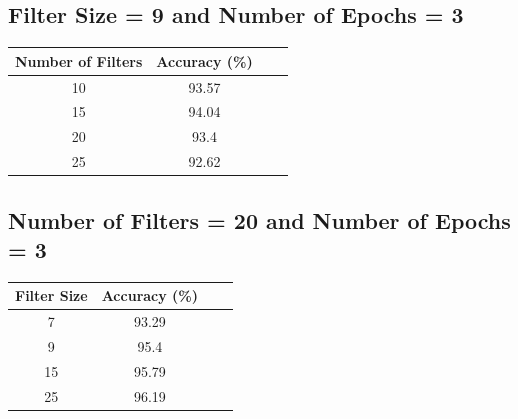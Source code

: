 \documentclass{article}
\begin{document}
\subsection{Filter Size = 9 and Number of Epochs = 3}
\begin{center}
 \begin{tabular}{||c| c| c| c||} 
 \hline
Number of Filters & Accuracy (\%)\\ [0.5ex] 
 \hline\hline
 10 & 93.57  \\ 
 \hline
 15 & 94.04 \\ 
 \hline
 20 & 93.4 \\
 \hline
 25 & 92.62 \\
 \hline
 
\end{tabular}
\end{center}

\subsection{Number of Filters = 20 and Number of Epochs = 3}
\begin{center}
 \begin{tabular}{||c| c| c| c||} 
 \hline
Filter Size & Accuracy (\%)\\ [0.5ex] 
 \hline\hline
 7 & 93.29  \\ 
 \hline
 9 & 95.4 \\ 
 \hline
 15 & 95.79 \\ 
 \hline
 25 & 96.19 \\
 \hline
 
\end{tabular}
\end{center}

\end{document}
